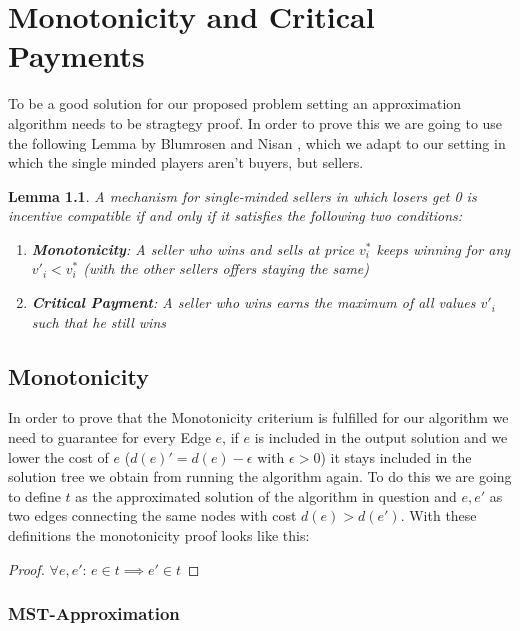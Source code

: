 
\newtheorem{lemma}{Lemma}
\chapter{Monotonicity and Critical Payments}\label{chapter:monotonicity&criticalpayment}


To be a good solution for our proposed problem setting an approximation algorithm needs to be stragtegy proof. In order to prove this we are going to use the following Lemma by Blumrosen and Nisan \cite{BlNi07}, which we adapt to our setting in which the single minded players aren't buyers, but sellers.
\begin{lemma}
A mechanism for single-minded sellers in which losers get 0 is incentive compatible if and only if it satisfies the following two conditions:
\begin{enumerate}[label=\roman*)]
            \item \textbf{Monotonicity}: A seller who wins and sells at price $v_i^*$ keeps winning for any $v'_i<v_i^*$ (with the other sellers offers staying the same)
            \item \textbf{Critical Payment}: A seller who wins earns the maximum of all values $v'_i$ such that he still wins
\end{enumerate}
\end{lemma} 

\section{Monotonicity}

In order to prove that the Monotonicity criterium is fulfilled for our algorithm we need to guarantee for every Edge $e$, if $e$ is included in the output solution and we lower the cost of $e$ ($d(e)'=d(e)-\epsilon$ with $\epsilon > 0$) it stays included in the solution tree we obtain from running the algorithm again. To do this we are going to define $t$ as the approximated solution of the algorithm in question and $e, e'$ as two edges connecting the same nodes with cost $d(e)>d(e')$. With these definitions the monotonicity proof looks like this: 
\begin{proof}
$\forall e, e'$: $e\in t \implies e'\in t$
\end{proof}

\subsection{MST-Approximation}

